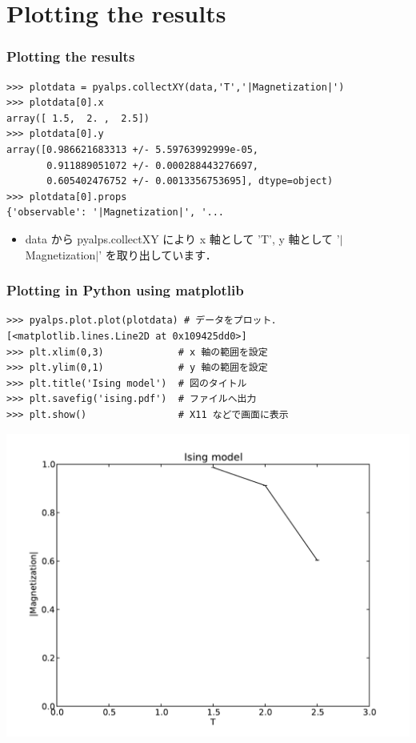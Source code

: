 \section{Plotting the results}
\begin{frame}[t,fragile]
\frametitle{Plotting the results}
\begin{lstlisting}
>>> plotdata = pyalps.collectXY(data,'T','|Magnetization|')
>>> plotdata[0].x
array([ 1.5,  2. ,  2.5])
>>> plotdata[0].y
array([0.986621683313 +/- 5.59763992999e-05,
       0.911889051072 +/- 0.000288443276697,
       0.605402476752 +/- 0.0013356753695], dtype=object)
>>> plotdata[0].props
{'observable': '|Magnetization|', '...
\end{lstlisting}
\begin{itemize}
\item data から pyalps.collectXY により x 軸として 'T', y 軸として '$|$Magnetization$|$' を取り出しています．
\end{itemize}
\end{frame}

\begin{frame}[t,fragile]
\frametitle{Plotting in Python using matplotlib}
\begin{lstlisting}
>>> pyalps.plot.plot(plotdata) # データをプロット．
[<matplotlib.lines.Line2D at 0x109425dd0>]
>>> plt.xlim(0,3)             # x 軸の範囲を設定
>>> plt.ylim(0,1)             # y 軸の範囲を設定
>>> plt.title('Ising model')  # 図のタイトル
>>> plt.savefig('ising.pdf')  # ファイルへ出力
>>> plt.show()                # X11 などで画面に表示
\end{lstlisting}
\includegraphics[scale=0.2]{ising.pdf}
\end{frame}

